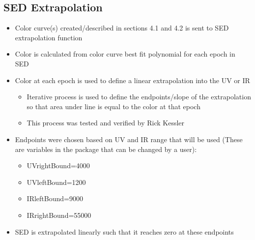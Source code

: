 \subsection{SED Extrapolation}
\begin{itemize}
\item Color curve(s) created/described in sections 4.1 and 4.2 is sent to SED extrapolation function
\item Color is calculated from color curve best fit polynomial for each epoch in SED
\item Color at each epoch is used to define a linear extrapolation into the UV or IR
\begin{itemize}
\item Iterative process is used to define the endpoints/slope of the extrapolation so that area under line is equal to the color at that epoch
\item This process was tested and verified by Rick Kessler
\end{itemize}
\item Endpoints were chosen based on UV and IR range that will be used (These are variables in the package that can be changed by a user):
\begin{itemize}
\item UVrightBound=4000
\item UVleftBound=1200
\item IRleftBound=9000
\item IRrightBound=55000
\end{itemize}
\item SED is extrapolated linearly such that it reaches zero at these endpoints

\end{itemize}